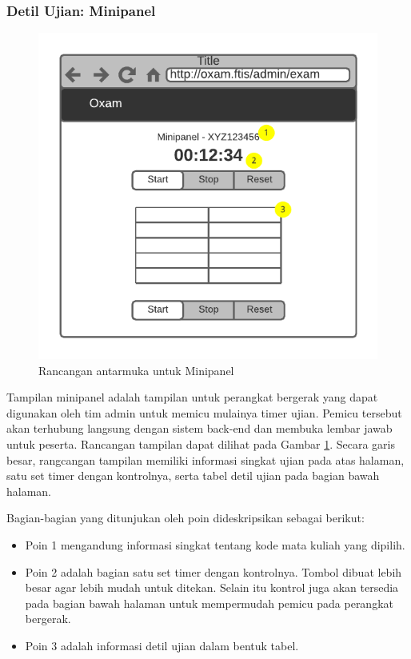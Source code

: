 \subsubsection{Detil Ujian: Minipanel}
    \begin{figure}
        \centering
        \includegraphics{Gambar/mockups/Mockup--Admin - Minipanel.pdf}
        \caption{Rancangan antarmuka untuk Minipanel}
        \label{fig:mockup_admin_minipanel}
    \end{figure}
    Tampilan minipanel adalah tampilan untuk perangkat bergerak yang dapat digunakan oleh tim admin
    untuk memicu mulainya timer ujian. Pemicu tersebut akan terhubung langsung dengan sistem back-end
    dan membuka lembar jawab untuk peserta. Rancangan tampilan dapat dilihat pada Gambar
    \ref{fig:mockup_admin_minipanel}. Secara garis besar, rangcangan tampilan memiliki informasi
    singkat ujian pada atas halaman, satu set timer dengan kontrolnya, serta tabel detil ujian
    pada bagian bawah halaman.
    
    Bagian-bagian yang ditunjukan oleh poin dideskripsikan sebagai berikut:
    \begin{itemize}
        \item Poin 1 mengandung informasi singkat tentang kode mata kuliah yang dipilih.
        
        \item Poin 2 adalah bagian satu set timer dengan kontrolnya. Tombol dibuat lebih besar
            agar lebih mudah untuk ditekan. Selain itu kontrol juga akan tersedia pada bagian bawah
            halaman untuk mempermudah pemicu pada perangkat bergerak.
            
        \item Poin 3 adalah informasi detil ujian dalam bentuk tabel.
    \end{itemize}
    
